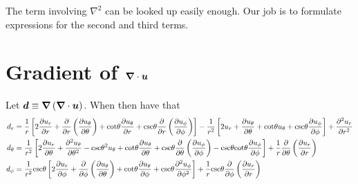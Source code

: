 \documentclass[10pt, letterpaper]{article}
\begin{document}
The term involving $\nabla^2$ can be looked up easily enough.   Our job is to formulate expressions for the second and third terms.

\section{Gradient of $\boldsymbol{\nabla}\cdot\boldsymbol{u}$}
Let $\boldsymbol{d}\equiv\boldsymbol{\nabla}\left(\boldsymbol{\nabla}\cdot\boldsymbol{u}\right)$.   When then have that
\begin{align}
d_r& =  \frac{1}{r} \left[2 \frac{\partial u_r}{\partial r} + \frac{\partial}{\partial r} \left(\frac{\partial u_{\theta}}{\partial \theta} \right) + \mathrm{cot}\theta \frac{\partial u_{\theta}}{\partial r} + \mathrm{csc}\theta \frac{\partial}{\partial r} \left(\frac{\partial u_{\phi}}{\partial \phi} \right) \right] - \frac{1}{r^2} \left[2 u_r + \frac{\partial u_{\theta}}{\partial \theta} + \mathrm{cot}\theta u_{\theta} + \mathrm{csc}\theta \frac{\partial u_{\phi}}{\partial \phi} \right] + \frac{\partial^2 u_r}{\partial r^2}        \\
d_\theta& = \frac{1}{r^2}\left[2 \frac{\partial u_r}{\partial \theta} + \frac{\partial^2 u_{\theta}}{\partial \theta^2} - \mathrm{csc}\theta^2 u_{\theta} + \mathrm{cot}\theta \frac{\partial u_{\theta}}{\partial \theta} + \mathrm{csc}\theta \frac{\partial}{\partial \theta}\left(\frac{\partial u_{\phi}}{\partial \phi} \right) - \mathrm{csc}\theta \mathrm{cot}\theta \frac{\partial u_{\phi}}{\partial \phi}\right] + \frac{1}{r} \frac{\partial}{\partial \theta} \left(\frac{\partial u_r}{\partial r} \right)     \\
d_\phi& = \frac{1}{r^2} \mathrm{csc}\theta \left[2 \frac{\partial u_r}{\partial \phi} + \frac{\partial}{\partial \phi} \left(\frac{\partial u_{\theta}}{\partial \theta} \right) + \mathrm{cot}\theta \frac{\partial u_{\theta}}{\partial \phi} + \mathrm{csc}\theta \frac{\partial^2 u_{\phi}}{\partial \phi^2} \right] + \frac{1}{r} \mathrm{csc}\theta \frac{\partial}{\partial \phi} \left(\frac{\partial u_r}{\partial r} \right)
\end{align}
\end{document}
